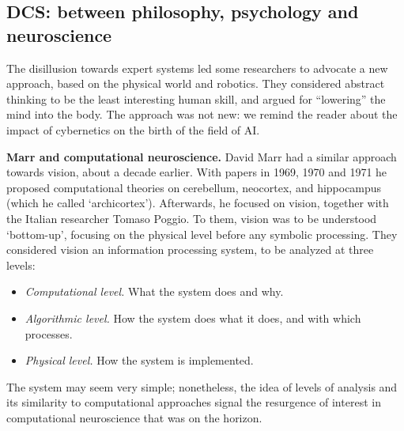 \documentclass[../main.tex]{subfiles}
\begin{document}
\subsection{DCS: between philosophy, psychology and neuroscience}
The disillusion towards expert systems led some researchers to advocate a new approach, based on the physical world and robotics. They considered abstract thinking to be the least interesting human skill, and argued for ``lowering'' the mind into the body. The approach was not new: we remind the reader about the impact of cybernetics on the birth of the field of AI.

\vspace{4pt}
\textbf{Marr and computational neuroscience.}
David Marr had a similar approach towards vision, about a decade earlier. With papers in 1969, 1970 and 1971 he proposed computational theories on cerebellum\cite{marrTheoryCerebellarCortex1969}, neocortex\cite{marrTheoryCerebralNeocortex1970}, and hippocampus (which he called `archicortex')\cite{marrSimpleMemoryTheory1971}. Afterwards, he focused on vision, together with the Italian researcher Tomaso Poggio. To them, vision was to be understood `bottom-up', focusing on the physical level before any symbolic processing. They considered vision an information processing system, to be analyzed at three levels\cite{marrUnderstandingComputationUnderstanding1976}:

\begin{itemize}
    \item \textit{Computational level.} What the system does and why.
    \item \textit{Algorithmic level.} How the system does what it does, and with which processes.
    \item \textit{Physical level.} How the system is implemented.
\end{itemize}

The system may seem very simple; nonetheless, the idea of levels of analysis and its similarity to computational approaches signal the resurgence of interest in computational neuroscience that was on the horizon.
\end{document}
